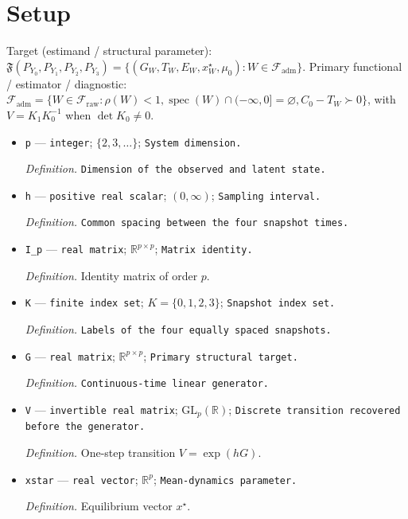 \documentclass{article}
\begin{document}
\section{Setup}

Target (estimand / structural parameter): \(\mathfrak F(P_{Y_0},P_{Y_1},P_{Y_2},P_{Y_3})=\{(G_W,T_W,E_W,x_W^\star,\mu_0):W\in\mathcal F_{\mathrm{adm}}\}\).
Primary functional / estimator / diagnostic: \(\mathcal F_{\mathrm{adm}}=\{W\in\mathcal F_{\mathrm{raw}}:\rho(W)<1,\operatorname{spec}(W)\cap(-\infty,0]=\varnothing,C_0-T_W\succ0\}\), with \(V=K_1K_0^{-1}\) when \(\det K_0\ne0\).
\begin{itemize}
  \item \texttt{p} --- \texttt{integer}; \(\{2,3,\ldots\}\); \texttt{System dimension.}
  \par\smallskip\noindent\emph{Definition.} \texttt{Dimension of the observed and latent state.}
  \item \texttt{h} --- \texttt{positive real scalar}; \((0,\infty)\); \texttt{Sampling interval.}
  \par\smallskip\noindent\emph{Definition.} \texttt{Common spacing between the four snapshot times.}
  \item \texttt{I\_\allowbreak{}p} --- \texttt{real matrix}; \(\mathbb R^{p\times p}\); \texttt{Matrix identity.}
  \par\smallskip\noindent\emph{Definition.} Identity matrix of order \(p\).
  \item \texttt{K} --- \texttt{finite index set}; \(K=\{0,1,2,3\}\); \texttt{Snapshot index set.}
  \par\smallskip\noindent\emph{Definition.} \texttt{Labels of the four equally spaced snapshots.}
  \item \texttt{G} --- \texttt{real matrix}; \(\mathbb R^{p\times p}\); \texttt{Primary structural target.}
  \par\smallskip\noindent\emph{Definition.} \texttt{Continuous-\allowbreak{}time linear generator.}
  \item \texttt{V} --- \texttt{invertible real matrix}; \(\mathrm{GL}_{p}(\mathbb R)\); \texttt{Discrete transition recovered before the generator.}
  \par\smallskip\noindent\emph{Definition.} One-step transition \(V=\exp(hG)\).
  \item \texttt{xstar} --- \texttt{real vector}; \(\mathbb R^p\); \texttt{Mean-\allowbreak{}dynamics parameter.}
  \par\smallskip\noindent\emph{Definition.} Equilibrium vector \(x^\star\).

\end{itemize}
\end{document}
